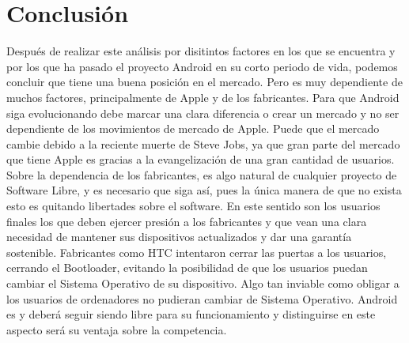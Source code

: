 \documentclass[11pt]{article}
\begin{document}
\newpage

\section{Conclusión}
Después de realizar este análisis por disitintos factores en los que se encuentra y por los que ha pasado el proyecto Android en su corto periodo de vida, podemos concluir que tiene una buena posición en el mercado. Pero es muy dependiente de muchos factores, principalmente de Apple y de los fabricantes. Para que Android siga evolucionando debe marcar una clara diferencia o crear un mercado y no ser dependiente de los movimientos de mercado de Apple. Puede que el mercado cambie debido a la reciente muerte de Steve Jobs, ya que gran parte del mercado que tiene Apple es gracias a la evangelización de una gran cantidad de usuarios. Sobre la dependencia de los fabricantes, es algo natural de cualquier proyecto de Software Libre, y es necesario que siga así, pues la única manera de que no exista esto es quitando libertades sobre el software. En este sentido son los usuarios finales los que deben ejercer presión a los fabricantes y que vean una clara necesidad de mantener sus dispositivos actualizados y dar una garantía sostenible. Fabricantes como HTC intentaron cerrar las puertas a los usuarios, cerrando el Bootloader, evitando la posibilidad de que los usuarios puedan cambiar el Sistema Operativo de su dispositivo. Algo tan inviable como obligar a los usuarios de ordenadores no pudieran cambiar de Sistema Operativo.
Android es y deberá seguir siendo libre para su funcionamiento y distinguirse en este aspecto será su ventaja sobre la competencia.

\newpage
\end{document}

